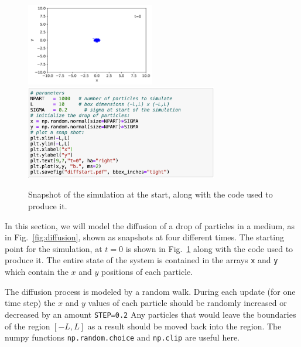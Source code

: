\begin{figure}[htbp]
 \begin{center}
  \includegraphics[width=0.50\textwidth]{figs/labs/monte_carlo/diffstart.pdf}
  \includegraphics[width=0.75\textwidth]{figs/labs/monte_carlo/diffstart-code.png}
  \caption{Snapshot of the simulation at the start, along with the code used to produce it.}
\label{fig:diffstart}
\end{center}
\end{figure}


\noindent
In this section, we will model the diffusion of a drop of particles in
a medium, as in Fig.~\ref{fig:diffusion}, shown as snapshots at four
different times.  The starting point for the simulation, at $t=0$ is
shown in Fig.~\ref{fig:diffstart} along with the code used to produce
it.  The entire state of the system is contained in the arrays {\tt x}
and {\tt y} which contain the $x$ and $y$ positions of each particle.

The diffusion process is modeled by a random walk. During each update
(for one time step) the $x$ and $y$ values of each particle should be
randomly increased or decreased by an amount {\tt STEP=0.2} Any
particles that would leave the boundaries of the region $[-L,L]$ as a
result should be moved back into the region.  The numpy functions 
{\tt np.random.choice} and {\tt np.clip} are useful here.

